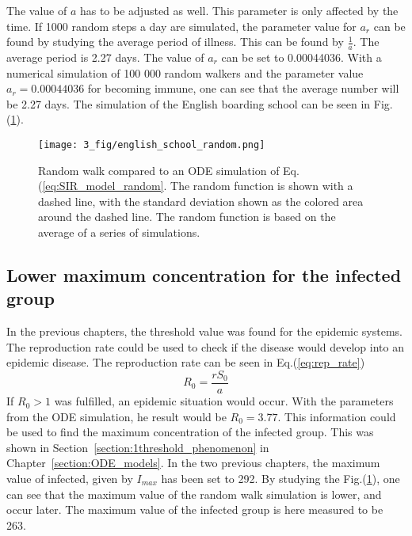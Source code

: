 \documentclass[%
twoside,                 %
final,                   %
chapterprefix=true,      %
open=right               %
10pt]{book}
\begin{document}
\vspace{3mm}




\vspace{3mm}


The value of $a$ has to be adjusted as well. This parameter is only affected by the time. If 1000 random steps a day are simulated, the parameter value for $a_r$ can be found by studying the average period of illness. This can be found by $\frac{1}{a}$. The average period is 2.27 days. The value of $a_r$ can be set to 0.00044036. With a numerical simulation of 100 000 random walkers and the parameter value $a_r=0.00044036$ for becoming immune, one can see that the average number will be 2.27 days. The simulation of the English boarding school can be seen in Fig.(\ref{fig:english_school_random}).


\begin{figure}[ht]
  \centerline{\texttt{[image: 3\_fig/english\_school\_random.png]}}
  \caption{
  \label{fig:english_school_random}Random walk compared to an ODE simulation of Eq.(\ref{eq:SIR_model_random}. The random function is shown with a dashed line, with the standard deviation shown as the colored area around the dashed line. The random function is based on the average of a series of simulations.
  }
\end{figure}


\subsection{Lower maximum concentration for the infected group}
In the previous chapters, the threshold value was found for the epidemic systems. The reproduction rate could be used to check if the disease would develop into an epidemic disease. The reproduction rate can be seen in Eq.(\ref{eq:rep_rate})
\begin{equation} \label{eq:rep_rate}
R_0 = \frac{rS_0}{a}
\end{equation}
If $R_0> 1$ was fulfilled, an epidemic situation would occur. With the parameters from the ODE simulation, he result would be $R_0 = 3.77$. This information could be used to find the maximum concentration of the infected group. This was shown in Section~\ref{section:1threshold_phenomenon} in Chapter~\ref{section:ODE_models}. In the two previous chapters, the maximum value of infected, given by $I_{max}$ has been set to 292. By studying the Fig.(\ref{fig:english_school_random}), one can see that the maximum value of the random walk simulation is lower, and occur later. The maximum value of the infected group is here measured to be 263. 
\end{document}
